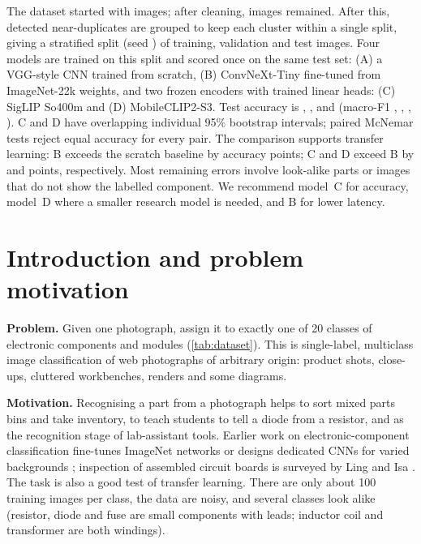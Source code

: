 \documentclass[11pt,a4paper]{article}
\newcommand{\mC}{model~C\xspace}
\newcommand{\mD}{model~D\xspace}\newcommand{\MD}{Model~D\xspace}
\begin{document}
\begin{titlepage}
\begin{minipage}{0.9\textwidth}
The dataset started with \nRaw images; after cleaning, \nRows images remained. After this, detected near-duplicates are grouped to keep each cluster within a single split, giving a stratified split (seed \splitSeed) of \nTrain training, \nVal validation and \nTest
test images. Four models are trained on this split and scored once on the same test set: (A) a
VGG-style CNN trained from scratch, (B) ConvNeXt-Tiny fine-tuned from ImageNet-22k weights, and two frozen encoders with trained linear heads:
(C) SigLIP So400m and (D) MobileCLIP2-S3.
Test accuracy is \accA, \accB, \accC and \accD (macro-F1 \foneA, \foneB, \foneC, \foneD).
C and D have overlapping individual 95\% bootstrap intervals; paired McNemar tests reject equal accuracy for every pair.
The comparison supports transfer learning: B exceeds the scratch baseline by
\diffBA{} accuracy points; C and D exceed B by \diffCB{} and \diffDB{} points, respectively. Most remaining errors involve look-alike parts or images that do not show the labelled
component. We recommend \mC for accuracy, \mD where a smaller research model is needed, and B for lower latency.
\end{minipage}
\vspace*{1cm}
\end{titlepage}

\section{Introduction and problem motivation}\label{sec:intro}

\textbf{Problem.} Given one photograph, assign it to exactly one of 20 classes of electronic components and modules
(\cref{tab:dataset}). This is single-label, multiclass image classification of web photographs of arbitrary origin:
product shots, close-ups, cluttered workbenches, renders and some diagrams.

\textbf{Motivation.} Recognising a part from a photograph helps to sort mixed parts bins and take inventory, to teach
students to tell a diode from a resistor, and as the recognition stage of lab-assistant tools. Earlier work on
electronic-component classification fine-tunes ImageNet networks \citep{shao2025electronic} or designs dedicated
CNNs for varied backgrounds \citep{zhou2025electronic}; inspection of assembled circuit boards is surveyed by Ling and Isa
\citep{ling2023pcb}. The task is also a good test of transfer learning. There are only about 100 training images per
class, the data are noisy, and several classes look alike (resistor, diode and fuse are small components with
leads; inductor coil and transformer are both windings).
\end{document}
